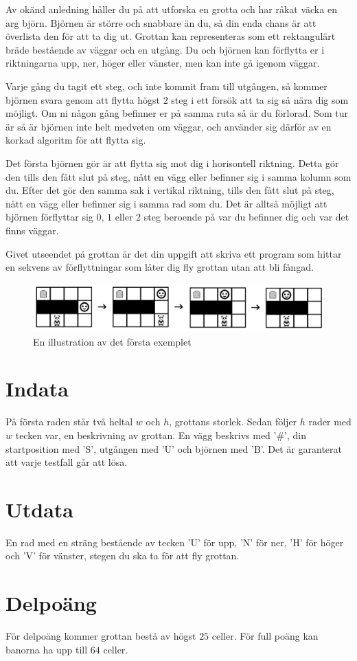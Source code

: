 Av okänd anledning håller du på att utforska en grotta och har råkat väcka en arg björn. Björnen är större och snabbare än du, så din enda chans är att överlista den för att ta dig ut. Grottan kan representeras som ett rektangulärt bräde bestående av väggar och en utgång. Du och björnen kan förflytta er i riktningarna upp, ner, höger eller vänster, men kan inte gå igenom väggar.

Varje gång du tagit ett steg, och inte kommit fram till utgången, så kommer björnen svara genom att flytta högst $2$ steg i ett försök att ta sig så nära dig som möjligt. Om ni någon gång befinner er på samma ruta så är du förlorad. Som tur är så är björnen inte helt medveten om väggar, och använder sig därför av en korkad algoritm för att flytta sig.

Det första björnen gör är att flytta sig mot dig i horisontell riktning. Detta gör den tills den fått slut på steg, nått en vägg eller befinner sig i samma kolumn som du. Efter det gör den samma sak i vertikal riktning, tills den fått slut på steg, nått en vägg eller befinner sig i samma rad som du. Det är alltså möjligt att björnen förflyttar sig $0$, $1$ eller $2$ steg beroende på var du befinner dig och var det finns väggar.

Givet utseendet på grottan är det din uppgift att skriva ett program som hittar en sekvens av förflyttningar som låter dig fly grottan utan att bli fångad.

\begin{figure}[ht!]
\centering
\includegraphics[width=\textwidth]{grottflykt.png}
\caption{En illustration av det första exemplet}
\label{overflow}
\end{figure}

\section*{Indata}
På första raden står två heltal $w$ och $h$, grottans storlek. Sedan följer $h$ rader med $w$ tecken var, en beskrivning av grottan. En vägg beskrivs med '\#', din startposition med 'S', utgången med 'U' och björnen med 'B'. Det är garanterat att varje testfall går att lösa. 
\section*{Utdata}
En rad med en sträng bestående av tecken 'U' för upp, 'N' för ner, 'H' för höger och 'V' för vänster, stegen du ska ta för att fly grottan.

\section*{Delpoäng}
För delpoäng kommer grottan bestå av högst $25$ celler. För full poäng kan banorna ha upp till $64$ celler.
